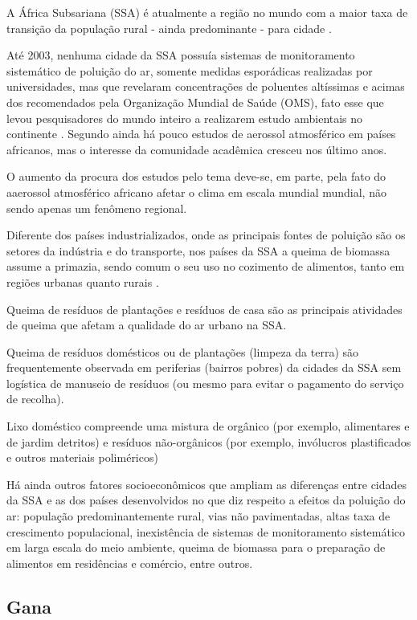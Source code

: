 A África Subsariana (SSA) é atualmente a região no mundo com a maior 
taxa de transição da população rural - ainda predominante - para cidade
\citep{MONTGOMERY2008}. 

Até 2003, nenhuma cidade da SSA possuía sistemas de monitoramento 
sistemático de poluição do ar, somente medidas esporádicas realizadas
por universidades, mas que revelaram concentrações de poluentes altíssimas e 
acimas dos recomendados pela Organização Mundial de Saúde (OMS),
fato esse que levou pesquisadores do mundo inteiro a 
realizarem estudo ambientais no continente \citep{EZZATI2004}. 
Segundo \cite{aboh2009} ainda há pouco estudos de aerossol atmosférico 
em países africanos, mas o interesse da comunidade acadêmica cresceu
nos último anos.
 
O aumento da procura dos estudos pelo tema deve-se, em parte, 
pela fato do aaerossol atmosférico africano afetar o clima 
em escala mundial mundial, não sendo apenas um fenômeno regional.

Diferente dos países industrializados, onde as principais fontes de poluição 
são os setores da indústria e do transporte, nos países da SSA a 
queima de biomassa assume a primazia, sendo comum o seu uso no cozimento 
de alimentos, tanto em regiões urbanas quanto rurais \citep{SMITH2004}. 

Queima de resíduos de plantações e resíduos de casa são as principais 
atividades de queima que afetam a qualidade do ar urbano  na SSA.

Queima de resíduos domésticos ou de plantações (limpeza da terra) são frequentemente observada 
em periferias (bairros pobres) da cidades da SSA sem logística de manuseio de 
resíduos (ou mesmo para evitar o pagamento do serviço de recolha).

Lixo doméstico compreende uma mistura de orgânico 
(por exemplo, alimentares e de jardim detritos)
e resíduos não-orgânicos (por exemplo, invólucros plastificados e
outros materiais poliméricos) 

Há ainda outros fatores socioeconômicos que ampliam as diferenças entre
cidades da SSA e as dos países desenvolvidos no que diz respeito
a efeitos da poluição do ar: população predominantemente rural,
vias não pavimentadas, altas taxa de crescimento populacional,
inexistência de sistemas de monitoramento sistemático em larga escala do meio 
ambiente, queima de biomassa para o preparação de alimentos em 
residências e comércio, entre outros. 

\subsection{Gana}

